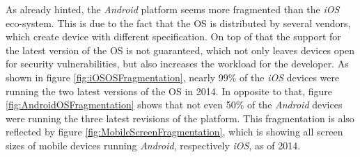 As already hinted, the \emph{Android} platform seems more fragmented than the \emph{iOS} eco-system. This is due to the fact that the \acrlong{OS} is distributed by several vendors, which create device with different specification. On top of that the support for the latest version of the \acrshort{OS} is not guaranteed, which not only leaves devices open for security vulnerabilities, but also increases the workload for the developer. As shown in figure \vref{fig:iOSOSFragmentation}, nearly 99\% of the \emph{iOS} devices were running the two latest versions of the \acrlong{OS} in 2014. In opposite to that, figure \ref{fig:AndroidOSFragmentation} shows that not even 50\% of the \emph{Android} devices were running the three latest revisions of the platform. This fragmentation is also reflected by figure \vref{fig:MobileScreenFragmentation}, which is showing all screen sizes of mobile devices running \emph{Android}, respectively \emph{iOS}, as of 2014.

